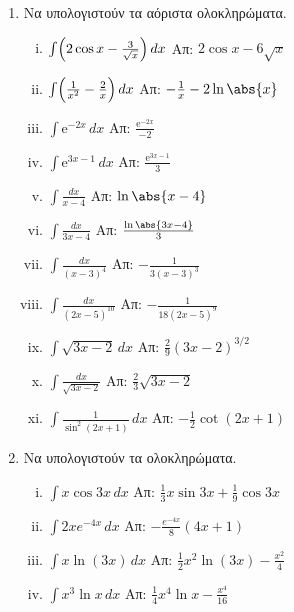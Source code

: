 \documentclass[a4paper,table]{report}
\begin{document}
\begin{center}
  \minibox{{\large\bfseries \textcolor{Col1}{Ασκήσεις στα Αόριστα Ολοκληρώματα}}}
\end{center}

\vspace{\baselineskip}


\begin{enumerate}
  \item Να υπολογιστούν τα αόριστα ολοκληρώματα.
    \begin{enumerate}[i)]
      \item $\int \Bigl(2 \cos{x} - \frac{3}{\sqrt{x}}\Bigr) \, dx $ 
        \hfill Απ: $ 2 \cos{x} - 6 \sqrt{x} $  
      \item $\int \Bigl(\frac{1}{x^{2}} - \frac{2}{x}\Bigr) \, dx  $ 
        \hfill Απ: $ - \frac{1}{x} - 2 \ln{\abs{x}} $
      \item $\int \mathrm{e}^{-2x} \, dx $ \hfill Απ: $ \frac{\mathrm{e}^{-2x}}{-2} $
      \item $\int \mathrm{e}^{3x-1} \, dx $ \hfill Απ: $ \frac{\mathrm{e}^{3x-1}}{3} $
      \item $\int\frac{dx}{x-4} $ \hfill Απ: $ \ln{\abs{x-4}}$
      \item $\int\frac{dx}{3x-4} $ \hfill Απ: $ \frac{\ln{\abs{3x-4}}}{3} $
      \item $\int\frac{dx}{(x-3)^{4}} $ \hfill Απ: $-\frac{1}{3(x-3)^{3}}$
      \item $\int\frac{dx}{(2x-5)^{10}} $ \hfill Απ: $-\frac{1}{18(2x-5)^9}$
      \item $ \int \sqrt{3x-2} \, dx $ \hfill Απ: $ \frac{2}{9} (3x-2)^{3/2} $
      \item $ \int\frac{dx}{\sqrt{3x-2}}$ \hfill Απ: $ \frac{2}{3}\sqrt{3x-2} $
      \item $ \int \frac{1}{\sin^{2}{(2x+1)}} \,{dx} $ 
        \hfill Απ: $ -\frac{1}{2} \cot{(2x+1)} $ 
    \end{enumerate}


  \item Να υπολογιστούν τα ολοκληρώματα.
    \begin{enumerate}[i)]
      \item $\int x\cos3x \, dx$ \hfill Απ: $\frac{1}{3}x\sin3x+ \frac{1}{9}\cos3x$
      \item $\int 2xe^{-4x} \, dx$ \hfill Απ: $-\frac{e^{-4x}}{8}(4x+1)$
      \item $ \int x \ln{(3x)} \,{dx} $ \hfill Απ: $ \frac{1}{2} x^{2} \ln{(3x)} -
        \frac{x^{2}}{4} $ 
      \item $ \int x^{3} \ln{x} \,{dx} $ \hfill Απ: $ \frac{1}{4} x^{4} \ln{x} -
        \frac{x^{4}}{16} $
    \end{enumerate}


\end{enumerate}
\end{document}
